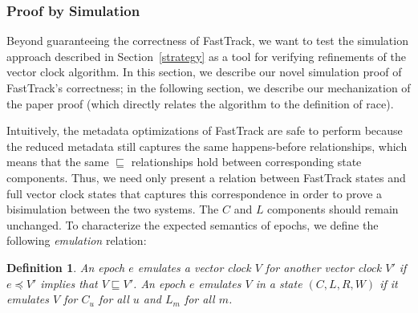 \documentclass[preprint, 10pt]{sigplanconf}
\newtheorem{definition}{Definition}
\begin{document}
\subsubsection{Proof by Simulation}
Beyond guaranteeing the correctness of FastTrack, we want to test the simulation approach described in Section~\ref{strategy} as a tool for verifying refinements of the vector clock algorithm. In this section, we describe our novel simulation proof of FastTrack's correctness; in the following section, we describe our mechanization of the paper proof (which directly relates the algorithm to the definition of race).

Intuitively, the metadata optimizations of FastTrack are safe to perform because the reduced metadata still captures the same happens-before relationships, which means that the same $\sqsubseteq$ relationships hold between corresponding state components. Thus, we need only present a relation between FastTrack states and full vector clock states that captures this correspondence in order to prove a bisimulation between the two systems. The $C$ and $L$ components should remain unchanged. To characterize the expected semantics of epochs, we define the following \emph{emulation} relation:
\begin{definition}An epoch $e$ \emph{emulates} a vector clock $V$ for another vector clock $V'$ if $e \preceq V'$ implies that $V \sqsubseteq V'$. An epoch $e$ emulates $V$ in a state $(C, L, R, W)$ if it emulates $V$ for $C_u$ for all $u$ and $L_m$ for all $m$.\end{definition}
\end{document}
